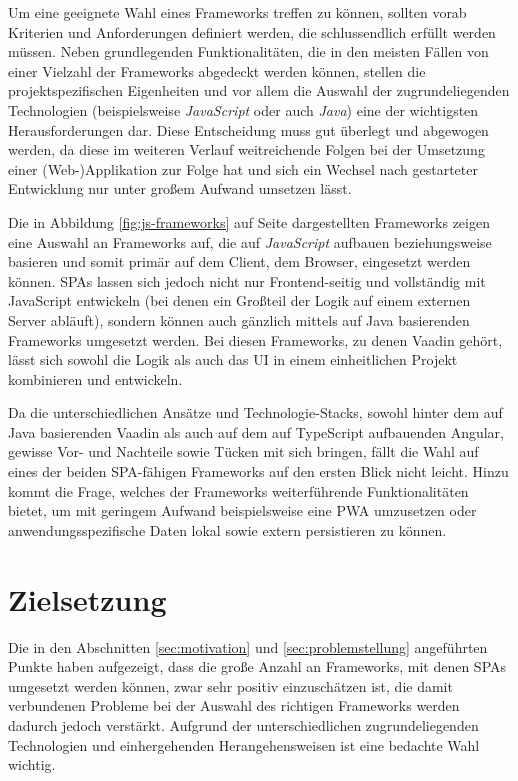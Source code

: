\documentclass[a4paper,12pt,twoside]{scrreprt}
\begin{document}
Um eine geeignete Wahl eines Frameworks treffen zu können, sollten vorab Kriterien und Anforderungen definiert werden, die schlussendlich erfüllt werden müssen. Neben grundlegenden Funktionalitäten, die in den meisten Fällen von einer Vielzahl der Frameworks abgedeckt werden können, stellen die projektspezifischen Eigenheiten und vor allem die Auswahl der zugrundeliegenden Technologien (beispielsweise \textit{JavaScript} oder auch \textit{Java}) eine der wichtigsten Herausforderungen dar. Diese Entscheidung muss gut überlegt und abgewogen werden, da diese im weiteren Verlauf weitreichende Folgen bei der Umsetzung einer (Web-)Applikation zur Folge hat und sich ein Wechsel nach gestarteter Entwicklung nur unter großem Aufwand umsetzen lässt.

Die in Abbildung \ref{fig:js-frameworks} auf Seite \pageref{fig:js-frameworks} dargestellten Frameworks zeigen eine Auswahl an Frameworks auf, die auf \textit{JavaScript} aufbauen beziehungsweise basieren und somit primär auf dem Client, dem Browser, eingesetzt werden können. \acp{SPA} lassen sich jedoch nicht nur Frontend-seitig und vollständig mit JavaScript entwickeln (bei denen ein Großteil der Logik auf einem externen Server abläuft), sondern können auch gänzlich mittels auf Java basierenden Frameworks umgesetzt werden. Bei diesen Frameworks, zu denen Vaadin gehört, lässt sich sowohl die Logik als auch das \ac{UI} in einem einheitlichen Projekt kombinieren und entwickeln.

Da die unterschiedlichen Ansätze und Technologie-Stacks, sowohl hinter dem auf Java basierenden Vaadin als auch auf dem auf TypeScript aufbauenden Angular, gewisse Vor- und Nachteile sowie Tücken mit sich bringen, fällt die Wahl auf eines der beiden \ac{SPA}-fähigen Frameworks auf den ersten Blick nicht leicht. Hinzu kommt die Frage, welches der Frameworks weiterführende Funktionalitäten bietet, um mit geringem Aufwand beispielsweise eine \ac{PWA} umzusetzen oder anwendungsspezifische Daten lokal sowie extern persistieren zu können.

\section{Zielsetzung}
\label{sec:zielsetzung}
\enlargethispage{\baselineskip}
Die in den Abschnitten \ref{sec:motivation} und \ref{sec:problemstellung} angeführten Punkte haben aufgezeigt, dass die große Anzahl an Frameworks, mit denen \acp{SPA} umgesetzt werden können, zwar sehr positiv einzuschätzen ist, die damit verbundenen Probleme bei der Auswahl des richtigen Frameworks werden dadurch jedoch verstärkt. Aufgrund der unterschiedlichen zugrundeliegenden Technologien und einhergehenden Herangehensweisen ist eine bedachte Wahl wichtig.
\end{document}
